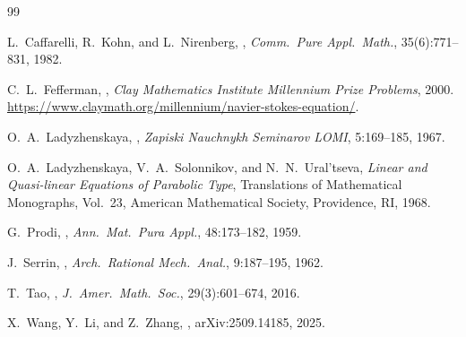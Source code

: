 \documentclass[11pt]{article}
\theoremstyle{definition}
\begin{document}


\begin{thebibliography}{99}

L.~Caffarelli, R.~Kohn, and L.~Nirenberg,
,
\newblock \emph{Comm.\ Pure Appl.\ Math.}, 35(6):771--831, 1982.

C.~L.~Fefferman,
,
\newblock \emph{Clay Mathematics Institute Millennium Prize Problems}, 2000.
\newblock \url{https://www.claymath.org/millennium/navier-stokes-equation/}.

O.~A.~Ladyzhenskaya,
,
\newblock \emph{Zapiski Nauchnykh Seminarov LOMI}, 5:169--185, 1967.

O.~A.~Ladyzhenskaya, V.~A.~Solonnikov, and N.~N.~Ural'tseva,
\newblock \emph{Linear and Quasi-linear Equations of Parabolic Type},
\newblock Translations of Mathematical Monographs, Vol.~23, American Mathematical Society,
Providence, RI, 1968.

G.~Prodi,
,
\newblock \emph{Ann.\ Mat.\ Pura Appl.}, 48:173--182, 1959.

J.~Serrin,
,
\newblock \emph{Arch.\ Rational Mech.\ Anal.}, 9:187--195, 1962.

T.~Tao,
,
\newblock \emph{J.\ Amer.\ Math.\ Soc.}, 29(3):601--674, 2016.

X.~Wang, Y.~Li, and Z.~Zhang,
,
\newblock arXiv:2509.14185, 2025.

\end{thebibliography}

\end{document}
